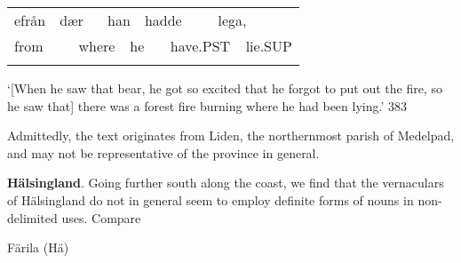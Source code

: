 \begin{tabular}{llllllllll}
\lsptoprule
efrån & \multicolumn{2}{l}{dær

} & \multicolumn{2}{l}{han

} & \multicolumn{2}{l}{hadde

} & \multicolumn{2}{l}{lega,

} & \\
\multicolumn{2}{l}{from

} & \multicolumn{2}{l}{where

} & \multicolumn{2}{l}{he 

} & \multicolumn{2}{l}{have.PST

} & \multicolumn{2}{l}{lie.SUP

}\\
\lspbottomrule
\end{tabular}

\begin{styleTranslation}
 ‘[When he saw that bear, he got so excited that he forgot to put out the fire, so he saw that] there was a forest fire burning where he had been lying.’ 383

\end{styleTranslation}

\begin{styleBodyTextFirst}
Admittedly, the text originates from Liden, the northernmost parish of Medelpad, and may not be representative of the province in general. 

\end{styleBodyTextFirst}

\begin{styleBodytextC}
\textbf{Hälsingland}. Going further south along the coast, we find that the vernaculars of Hälsingland do not in general seem to employ definite forms of nouns in non-delimited uses. Compare 

\end{styleBodytextC}

\begin{listWWNumileveli}
\item {}

\begin{styleExample}
Färila (Hä)

\end{styleExample}

\end{listWWNumileveli}

